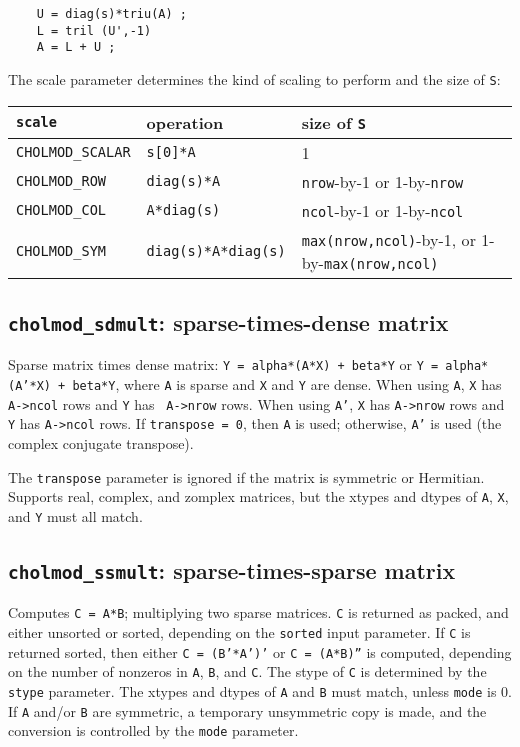 \documentclass[11pt]{article}
\begin{document}
\begin{verbatim}
    U = diag(s)*triu(A) ;
    L = tril (U',-1)
    A = L + U ;
\end{verbatim}

The scale parameter determines the kind of scaling to perform and the size of
{\tt S}:

\begin{tabular}{lll}
\hline
{\tt scale} & operation & size of {\tt S} \\
\hline
{\tt CHOLMOD\_SCALAR} & {\tt s[0]*A}            & 1 \\
{\tt CHOLMOD\_ROW}    & {\tt diag(s)*A}         & {\tt nrow}-by-1 or 1-by-{\tt nrow} \\
{\tt CHOLMOD\_COL}    & {\tt A*diag(s)}         & {\tt ncol}-by-1 or 1-by-{\tt ncol} \\
{\tt CHOLMOD\_SYM}    & {\tt diag(s)*A*diag(s)} & {\tt max(nrow,ncol)}-by-1, or 1-by-{\tt max(nrow,ncol)} \\
\hline
\end{tabular}

\subsection{{\tt cholmod\_sdmult}: sparse-times-dense matrix}


Sparse matrix times dense matrix: {\tt Y = alpha*(A*X) + beta*Y} or {\tt Y =
alpha*(A'*X) + beta*Y}, where {\tt A} is sparse and {\tt X} and {\tt Y} are
dense.  When using {\tt A}, {\tt X} has {\tt A->ncol} rows and {\tt Y} has {\tt
A->nrow} rows.  When using {\tt A'}, {\tt X} has {\tt A->nrow} rows and {\tt Y}
has {\tt A->ncol} rows.  If {\tt transpose = 0}, then {\tt A} is used;
otherwise, {\tt A'} is used (the complex conjugate transpose).

The {\tt transpose} parameter is ignored if the matrix is symmetric or
Hermitian.  Supports real, complex, and zomplex matrices, but the xtypes and
dtypes of {\tt A}, {\tt X}, and {\tt Y} must all match.

\subsection{{\tt cholmod\_ssmult}: sparse-times-sparse matrix}


Computes {\tt C = A*B}; multiplying two sparse matrices.  {\tt C} is returned
as packed, and either unsorted or sorted, depending on the {\tt sorted} input
parameter.  If {\tt C} is returned sorted, then either {\tt C = (B'*A')'} or
{\tt C = (A*B)''} is computed, depending on the number of nonzeros in {\tt A},
{\tt B}, and {\tt C}.  The stype of {\tt C} is determined by the {\tt stype}
parameter.  The xtypes and dtypes of \verb'A' and \verb'B' must match,
unless \verb'mode' is 0.
%
If \verb'A' and/or \verb'B' are symmetric, a temporary unsymmetric copy is
made, and the conversion is controlled by the \verb'mode' parameter.
\end{document}
